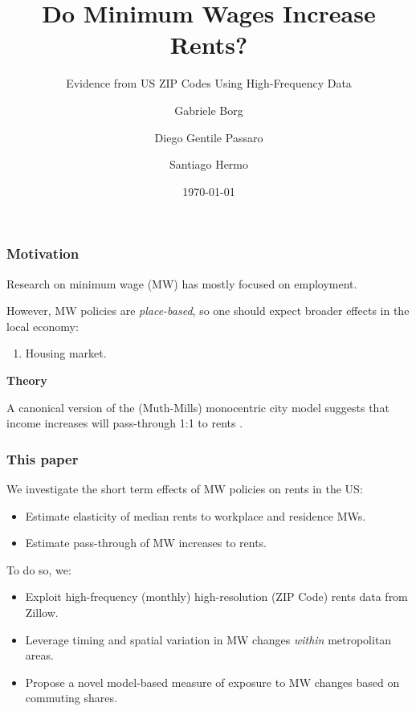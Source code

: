 \documentclass[aspectratio=169]{beamer}
\title{Do Minimum Wages Increase Rents?}
\subtitle{Evidence from US ZIP Codes Using High-Frequency Data}
\date{\today}
\author{Gabriele Borg \and Diego Gentile Passaro \and Santiago Hermo}
\institute{Brown University}
\begin{document}
\maketitle



\begin{frame}
	\frametitle{Motivation}
	
	Research on minimum wage (MW) has mostly focused on employment.
	
	\vspace{1.5mm}
	However, MW policies are \textit{place-based}, so one should expect broader effects 
	in the local economy:
	\begin{enumerate}[$\Rightarrow$]
		\item Housing market.
	\end{enumerate}

	\pause
	\vspace{3mm}
	\textbf{Theory}
	
    A canonical version of the (Muth-Mills) monocentric city model suggests that income increases will 
    pass-through 1:1 to rents \parencite{Brueckner1987}.
\end{frame}

\begin{frame}
	\frametitle{This paper}
	We investigate the short term effects of MW policies on rents in the US:
	\begin{itemize}
		\vspace{.5mm} \item Estimate elasticity of median rents to workplace and 
		residence MWs.
		\vspace{.5mm} \item Estimate pass-through of MW increases to rents.
	\end{itemize}
	
	\vspace{3mm}
	\pause
	To do so, we:
	\begin{itemize}
    	\vspace{.5mm} \item Exploit high-frequency (monthly) high-resolution 
    	(ZIP Code) rents data from Zillow.
    	\vspace{.5mm} \item Leverage timing and spatial variation in MW changes 
    	\textit{within} metropolitan areas.
    	\vspace{.5mm} \item Propose a novel model-based measure of exposure to MW changes based on 
    	commuting shares.
	\end{itemize}
\end{frame}
\end{document}
